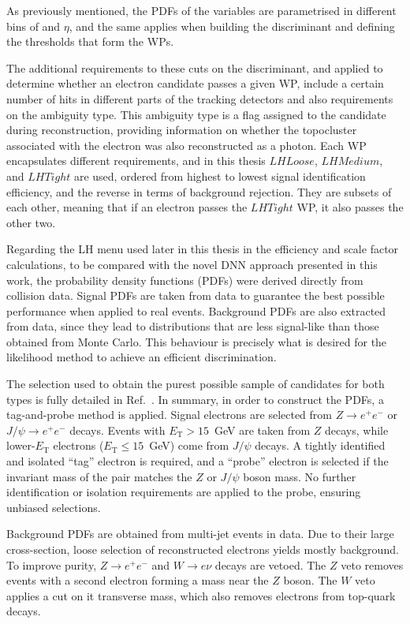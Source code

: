 As previously mentioned, the PDFs of the variables are parametrised in different bins of \et and $\eta$, and the same applies when building the discriminant and defining the thresholds that form the WPs.

The additional requirements to these cuts on the discriminant, and applied to determine whether an electron candidate passes a given WP, include a certain number of hits in different parts of the tracking detectors and also requirements on the ambiguity type. This ambiguity type is a flag assigned to the candidate during reconstruction, providing information on whether the topocluster associated with the electron was also reconstructed as a photon.
Each WP encapsulates different requirements, and in this thesis $LHLoose$, $LHMedium$, and $LHTight$ are used, ordered from highest to lowest signal identification efficiency, and the reverse in terms of background rejection. They are subsets of each other, meaning that if an electron passes the $LHTight$ WP, it also passes the other two.

Regarding the LH menu used later in this thesis in the efficiency and scale factor calculations, to be compared with the novel DNN approach presented in this work, the probability density functions (PDFs) were derived directly from collision data. Signal PDFs are taken from data to guarantee the best possible performance when applied to real events. Background PDFs are also extracted from data, since they lead to distributions that are less signal-like than those obtained from Monte Carlo. This behaviour is precisely what is desired for the likelihood method to achieve an efficient discrimination.

The selection used to obtain the purest possible sample of candidates for both types is fully detailed in Ref.~\cite{lucas_thesis}. In summary, in order to construct the PDFs, a tag-and-probe method is applied. Signal electrons are selected from $Z \rightarrow e^{+}e^{-}$ or $J/\psi \rightarrow e^{+}e^{-}$ decays. Events with $E_{\text{T}} > 15$~GeV are taken from $Z$ decays, while lower-$E_{\text{T}}$ electrons ($E_{\text{T}} \leq 15$~GeV) come from $J/\psi$ decays. A tightly identified and isolated “tag” electron is required, and a “probe” electron is selected if the invariant mass of the pair matches the $Z$ or $J/\psi$ boson mass. No further identification or isolation requirements are applied to the probe, ensuring unbiased selections.

Background PDFs are obtained from multi-jet events in data. Due to their large cross-section, loose selection of reconstructed electrons yields mostly background. To improve purity, $Z \rightarrow e^{+}e^{-}$ and $W \rightarrow e\nu$ decays are vetoed. The $Z$ veto removes events with a second electron forming a mass near the $Z$ boson. The $W$ veto applies a cut on it transverse mass, which also removes electrons from top-quark decays.


